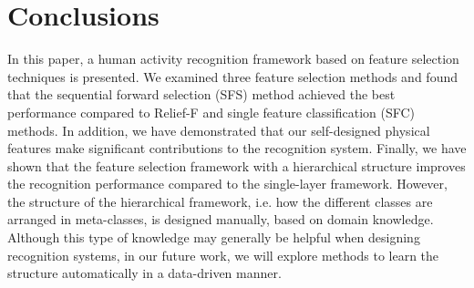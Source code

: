\documentclass[journal,article,submit,moreauthors,pdftex]{Definitions/mdpi}
\begin{document}
\section{Conclusions}
In this paper, a human activity recognition framework
based on feature selection techniques is presented. We examined three feature selection methods and found that the sequential forward selection (SFS) method achieved the best performance compared to Relief-F and single feature classification (SFC) methods. In addition, we have demonstrated that our self-designed physical features make significant contributions to the recognition system. Finally, we have shown that the feature selection framework with a hierarchical structure improves the recognition performance compared to the single-layer framework. However, the structure of the hierarchical framework, i.e. how the different classes are arranged in meta-classes, is designed manually, based on domain knowledge. Although this type of knowledge may generally be helpful when designing recognition systems, in our future work, we will explore methods to learn the structure automatically in a data-driven manner.
\vspace{6pt} 



\end{document}

